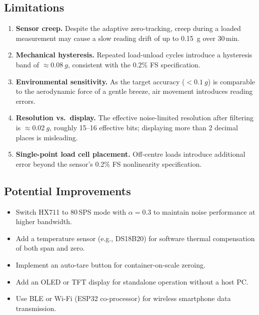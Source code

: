 \documentclass[12pt,a4paper]{article}
\begin{document}
\subsection{Limitations}

\begin{enumerate}
  \item \textbf{Sensor creep.} Despite the adaptive zero-tracking, creep during a loaded
        measurement may cause a slow reading drift of up to \SI{0.15}{g} over 30\,min.
  \item \textbf{Mechanical hysteresis.} Repeated load-unload cycles introduce a
        hysteresis band of $\approx\SI{0.08}{g}$, consistent with the 0.2\% FS
        specification.
  \item \textbf{Environmental sensitivity.} As the target accuracy ($<\SI{0.1}{g}$) is
        comparable to the aerodynamic force of a gentle breeze, air movement introduces
        reading errors.
  \item \textbf{Resolution vs.\ display.} The effective noise-limited resolution after
        filtering is $\approx\SI{0.02}{g}$, roughly 15--16 effective bits; displaying
        more than 2 decimal places is misleading.
  \item \textbf{Single-point load cell placement.} Off-centre loads introduce additional
        error beyond the sensor's 0.2\% FS nonlinearity specification.
\end{enumerate}

\subsection{Potential Improvements}

\begin{itemize}
  \item Switch HX711 to 80\,SPS mode with $\alpha = 0.3$ to maintain noise performance
        at higher bandwidth.
  \item Add a temperature sensor (e.g., DS18B20) for software thermal compensation of
        both span and zero.
  \item Implement an auto-tare button for container-on-scale zeroing.
  \item Add an OLED or TFT display for standalone operation without a host PC.
  \item Use BLE or Wi-Fi (ESP32 co-processor) for wireless smartphone data transmission.
\end{itemize}

\end{document}
